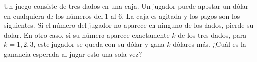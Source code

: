 \begin{statement}{10}
  Un juego consiste de tres dados en una caja.
  Un jugador puede apostar un d\'olar en cualquiera de los n\'umeros del $1$ al $6$.
  La caja es agitada y los pagos son los siguientes.
  Si el n\'umero del jugador no aparece en ninguno de los dados, pierde su dolar.
  En otro caso, si su n\'umero aparece exactamente $k$ de los tres dados, para $k = 1, 2, 3$, este
  jugador se queda con su d\'olar y gana $k$ d\'olares m\'as.
  ¿Cu\'al es la ganancia esperada al jugar esto una sola vez?
\end{statement}